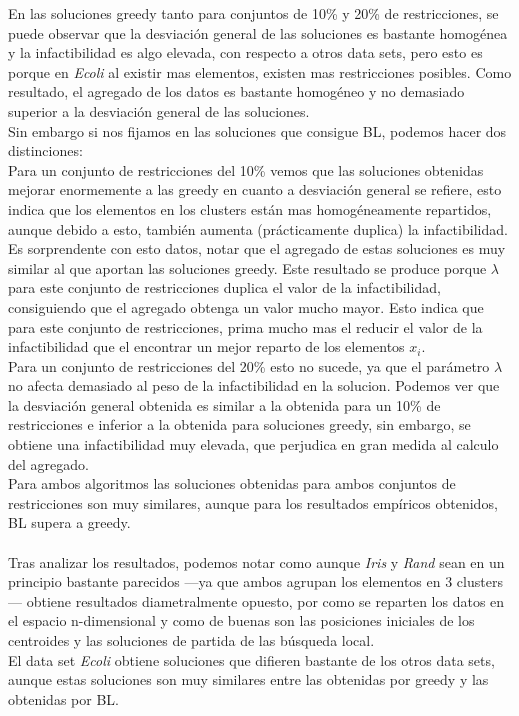 En las soluciones greedy tanto para conjuntos de 10\% y 20\% de restricciones, se puede observar que la desviación general de las soluciones es bastante homogénea y la infactibilidad es algo elevada, con respecto a otros data sets, pero esto es porque en \emph{Ecoli} al existir mas elementos, existen mas restricciones posibles. Como resultado, el agregado de los datos es bastante homogéneo y no demasiado superior a la desviación general de las soluciones.\\
Sin embargo si nos fijamos en las soluciones que consigue BL, podemos hacer dos distinciones:\\
Para un conjunto de restricciones del 10\% vemos que las soluciones obtenidas mejorar enormemente a las greedy en cuanto a desviación general se refiere, esto indica que los elementos en los clusters están mas homogéneamente repartidos, aunque debido a esto, también aumenta (prácticamente duplica) la infactibilidad. Es sorprendente con esto datos, notar que el agregado de estas soluciones es muy similar al que aportan las soluciones greedy. Este resultado se produce porque $ \lambda $ para este conjunto de restricciones duplica el valor de la infactibilidad, consiguiendo que el agregado obtenga un valor mucho mayor. Esto indica que para este conjunto de restricciones, prima mucho mas el reducir el valor de la infactibilidad que el encontrar un mejor reparto de los elementos $ x_{i} $.\\
Para un conjunto de restricciones del 20\% esto no sucede, ya que el parámetro $ \lambda $ no afecta demasiado al peso de la infactibilidad en la solucion. Podemos ver que la desviación general obtenida es similar a la obtenida para un 10\% de restricciones e inferior a la obtenida para soluciones greedy, sin embargo, se obtiene una infactibilidad muy elevada, que perjudica en gran medida al calculo del agregado.\\
Para ambos algoritmos las soluciones obtenidas para ambos conjuntos de restricciones son muy similares, aunque para los resultados empíricos obtenidos, BL supera a greedy.\\
\\
Tras analizar los resultados, podemos notar como aunque \emph{Iris} y \emph{Rand} sean en un principio bastante parecidos ---ya que ambos agrupan los elementos en 3 clusters--- obtiene resultados diametralmente opuesto, por como se reparten los datos en el espacio n-dimensional y como de buenas son las posiciones iniciales de los centroides y las soluciones de partida de las búsqueda local.\\
El data set \emph{Ecoli} obtiene soluciones que difieren bastante de los otros data sets, aunque estas soluciones son muy similares entre las obtenidas por greedy y las obtenidas por BL.

